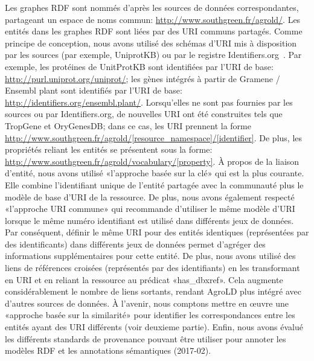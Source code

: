 Les graphes RDF sont nommés d'après les sources de données correspondantes, partageant un espace de noms commun: \url{http://www.southgreen.fr/agrold/}. Les entités dans les graphes RDF sont liées par des URI communs partagés. Comme principe de conception, nous avons utilisé des schémas d'URI mis à disposition par les sources (par exemple, UniprotKB) ou par le registre Identifiers.org~\cite{identifiers}. Par exemple, les protéines de UnitProtKB sont identifiées par l'URI de base: \url{http://purl.uniprot.org/uniprot/}; les gènes intégrés à partir de Gramene / Ensembl plant sont identifiés par l'URI de base: \url{http://identifiers.org/ensembl.plant/}. Lorsqu'elles ne sont pas fournies par les sources ou par Identifiers.org, de nouvelles URI ont été construites tels que TropGene et OryGenesDB; dans ce cas, les URI prennent la forme \url{http://www.southgreen.fr/agrold/[resource\_namespace]/[identifier]}. De plus, les propriétés reliant les entités se présentent sous la forme: \url{http://www.southgreen.fr/agrold/vocabulary/[property]}. À propos de la liaison d'entité, nous avons utilisé «l'approche basée sur la clé» qui est la plus courante. Elle combine l'identifiant unique de l'entité partagée avec la communauté plus le modèle de base d'URI de la ressource. De plus, nous avons également respecté «l’approche URI commune» qui recommande d’utiliser le même modèle d’URI lorsque le même numéro identifiant est utilisé dans différents jeux de données. Par conséquent, définir le même URI pour des entités identiques (représentées par des identificants) dans différents jeux de données permet d'agréger des informations supplémentaires pour cette entité. De plus, nous avons utilisé des liens de références croisées (représentés par des identifiants) en les transformant en URI et en reliant la ressource au prédicat «has\_dbxref». Cela augmente considérablement le nombre de liens sortants, rendant AgroLD plus intégré avec d'autres sources de données. À l'avenir, nous comptons mettre en œuvre une «approche basée sur la similarité» pour identifier les correspondances entre les entités ayant des URI différents (voir deuxieme partie). Enfin, nous avons évalué les différents standards de provenance pouvant être utiliser pour annoter les modèles RDF et les annotations sémantiques (2017-02). 

